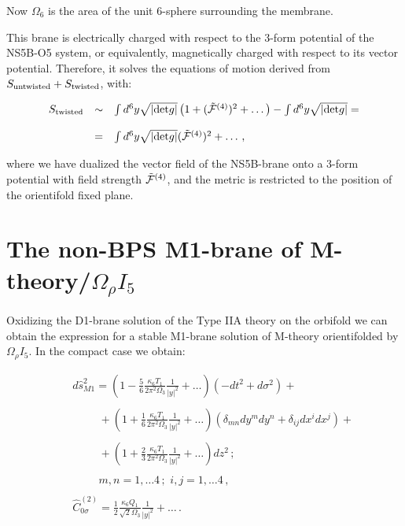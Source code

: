 \documentclass[12pt,a4paper]{article}
\begin{document}
\noindent Now $\Omega_6$ is the area of the unit 6-sphere surrounding
the membrane.

This brane is electrically charged with respect to the 3-form potential
of the NS5B-O5 system, or equivalently, magnetically charged with
respect to its vector potential. Therefore, it solves the equations of
motion derived from $S_{{\rm untwisted}}+S_{{\rm twisted}}$, with:

\begin{equation}
\begin{array}{rcl}
S_{{\rm twisted}}&\sim & \int d^6 y\sqrt{|{\rm det}g|}
\left(1+({\tilde {\cal F}}^{(4)})^2+\dots\right)-\int d^6 y
\sqrt{|{\rm det}g|}=\\
&&\\
&=&\int d^6 y\sqrt{|{\rm det}g|}({\tilde {\cal F}}^{(4)})^2+\dots\, ,\\
\end{array}
\end{equation}

\noindent where we have dualized the vector field of the NS5B-brane
onto a 3-form potential with field strength
${\tilde {\cal F}}^{(4)}$, and the metric is restricted to the position
of the orientifold fixed plane.

\section{The non-BPS M1-brane of M-theory/$\Omega_\rho I_5$}

Oxidizing the D1-brane solution of the Type IIA theory on the orbifold
we can obtain the expression for a stable M1-brane solution of
M-theory orientifolded by $\Omega_\rho I_5$. In the compact case we
obtain:


\begin{eqnarray}
\label{M1com}
&&d{\hat s}_{M1}^2=(1-\frac56 \frac{\kappa_6 T_1}{2\pi^2\Omega_3}
\frac{1}{|y|^2}+\dots)(-dt^2+d\sigma^2)+\nonumber\\
&&\nonumber\\
&&\hspace{1cm}+(1+\frac16 \frac{\kappa_6 T_1}{2\pi^2\Omega_3}
\frac{1}{|y|^2}+\dots)\left(\delta_{mn}dy^mdy^n+\delta_{ij}dx^i
dx^j\right)+\nonumber\\
&&\nonumber\\
&&\hspace{1cm}+(1+\frac23 \frac{\kappa_6 T_1}{2\pi^2\Omega_3}
\frac{1}{|y|^2}+\dots)dz^2\, ;\nonumber\\
&&\nonumber\\
&&\hspace{1cm}m,n=1,\dots 4\, ;\,\,i,j=1,\dots 4\, ,\nonumber\\
&&\nonumber\\
&& {\hat C}^{(2)}_{0\sigma}=\frac12 \frac{\kappa_6 Q_1}{\sqrt{2}\Omega_3}
\frac{1}{|y|^2}+\dots\, .
\end{eqnarray}
\end{document}
